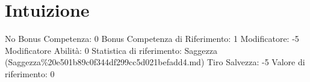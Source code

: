 \section{Intuizione}\label{intuizione}

\begin{description}
\tightlist
\item[Tags: ABI]
No Bonus Competenza: 0 Bonus Competenza di Riferimento: 1 Modificatore:
-5 Modificatore Abilità: 0 Statistica di riferimento: Saggezza
(Saggezza\%20e501b89c0f344df299cc5d021befadd4.md) Tiro Salvezza: -5
Valore di riferimento: 0
\end{description}
